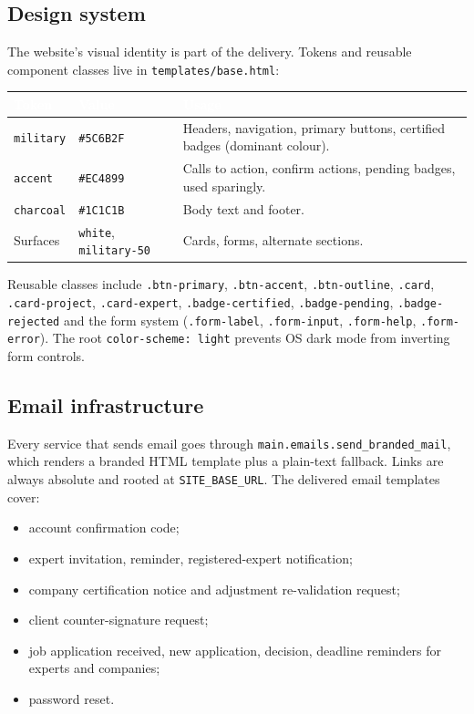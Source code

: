 \documentclass[11pt,a4paper]{article}
\renewcommand{\arraystretch}{1.25}
\newcommand{\theadcell}[1]{\textcolor{white}{\textbf{#1}}}
\newcommand{\tablehead}[1]{\rowcolor{mil900}#1}
\newcommand{\tablealt}{\rowcolor{mil50}}
\begin{document}
\subsection{Design system}

The website's visual identity is part of the delivery. Tokens and reusable
component classes live in \texttt{templates/base.html}:

\begin{center}
\renewcommand{\arraystretch}{1.3}
\begin{tabularx}{\textwidth}{@{}L{3.3cm}L{2.4cm}Y@{}}
  \toprule
  \tablehead{\theadcell{Token} & \theadcell{Value} & \theadcell{Usage}} \\
  \midrule
  \texttt{military} & \texttt{\#5C6B2F} & Headers, navigation, primary
  buttons, certified badges (dominant colour). \\
  \tablealt
  \texttt{accent} & \texttt{\#EC4899} & Calls to action, confirm actions,
  pending badges, used sparingly. \\
  \texttt{charcoal} & \texttt{\#1C1C1B} & Body text and footer. \\
  \tablealt
  Surfaces & \texttt{white}, \texttt{military-50} & Cards, forms, alternate
  sections. \\
  \bottomrule
\end{tabularx}
\end{center}

Reusable classes include \texttt{.btn-primary}, \texttt{.btn-accent},
\texttt{.btn-outline}, \texttt{.card}, \texttt{.card-project},
\texttt{.card-expert}, \texttt{.badge-certified}, \texttt{.badge-pending},
\texttt{.badge-rejected} and the form system (\texttt{.form-label},
\texttt{.form-input}, \texttt{.form-help}, \texttt{.form-error}). The root
\texttt{color-scheme: light} prevents OS dark mode from inverting form controls.

\subsection{Email infrastructure}

Every service that sends email goes through
\texttt{main.emails.send\_branded\_mail}, which renders a branded HTML template
plus a plain-text fallback. Links are always absolute and rooted at
\texttt{SITE\_BASE\_URL}. The delivered email templates cover:

\begin{itemize}[leftmargin=1.4em,itemsep=2pt]
  \item account confirmation code;
  \item expert invitation, reminder, registered-expert notification;
  \item company certification notice and adjustment re-validation request;
  \item client counter-signature request;
  \item job application received, new application, decision, deadline reminders
        for experts and companies;
  \item password reset.
\end{itemize}
\end{document}
